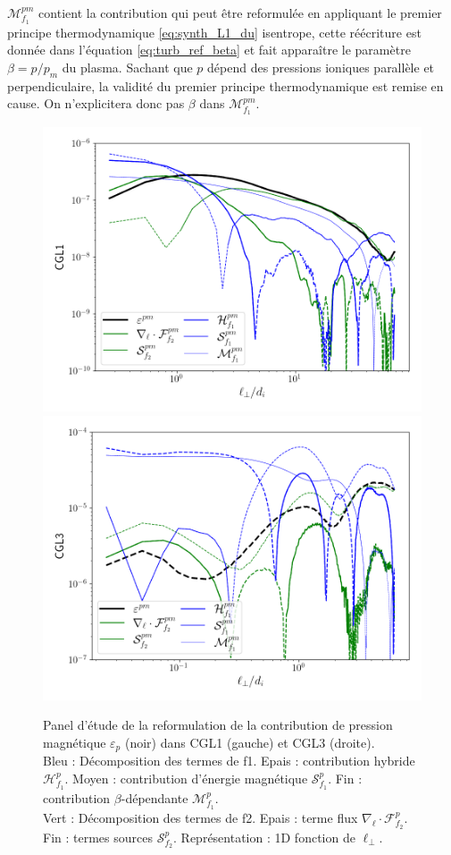 $\mathcal{M}^{pm}_{f_1}$ contient la contribution qui peut être reformulée en appliquant le premier principe thermodynamique \eqref{eq:synth_L1_du} isentrope, cette réécriture est donnée dans l'équation \eqref{eq:turb_ref_beta} et fait apparaître le paramètre $\beta = p/p_m$ du plasma. Sachant que $p$ dépend des pressions ioniques parallèle et perpendiculaire, la validité du premier principe thermodynamique est remise en cause. On n'explicitera donc pas $\beta$ dans $\mathcal{M}^{pm}_{f_1}$.
\begin{figure}[!ht]
 \centering
 \includegraphics[width=0.49\linewidth,trim=1cm 1cm 1cm 1cm, clip=true]{./Part_3/images_ch2/CGL1_f2pm_1D_lperp}
\hfill
\includegraphics[width=0.49\linewidth,trim=1cm 1cm 1cm 1cm, clip=true]{./Part_3/images_ch2/CGL3_f2pm_1D_lperp}
\cprotect\caption{Panel d'étude de la reformulation de la contribution de pression magnétique $\varepsilon_{p}$ (noir) dans CGL1 (gauche) et CGL3 (droite). \\Bleu : Décomposition des termes de f1. Epais : contribution hybride $\mathcal{H}^{p}_{f_1}$. Moyen : contribution d'énergie magnétique $\mathcal{S}^{p}_{f_1}$. Fin :  contribution $\beta$-dépendante $\mathcal{M}^{p}_{f_1}$.\\Vert : Décomposition des termes de f2. Epais : terme flux $\nabla_{\boldsymbol{\ell}} \cdot \mathcal{F}^{p}_{f_2}$. Fin : termes sources $\mathcal{S}^{p}_{f_2}$. Représentation : 1D fonction de $\ell_{\perp}$.}
\label{fig:elf2pm}
\end{figure}
